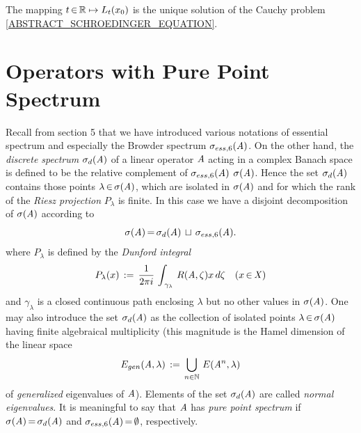\documentclass[11pt,twoside]{article}
\begin{document}
\begin{itemize}[leftmargin=12pt,itemsep=2mm,topsep=1mm]
\begin{theorem}\label{EXISTENCE_THEOREM_FOR_ABSTRACT_SCHROEDINGER_EQUATION}
The mapping $t {\,\in\,} {\mathbb{R}} \mapsto {L}_t(x_0)$ is the unique solution
of the Cauchy problem \eqref{ABSTRACT_SCHROEDINGER_EQUATION}.
\end{theorem}
\end{itemize}

\section{Operators with Pure Point Spectrum}                                   %
Recall from section 5 that we have introduced various notations of essential
spectrum and especially the Browder spectrum $\sigma_{ess,6}(\mathit{A})$.
On the other hand,
the \textit{discrete spectrum} $\sigma_d(\mathit{A})$ of a linear operator $\mathit{A}$
acting in a complex Banach space is defined to be
the relative complement of $\sigma_{ess,6}(\mathit{A})$ {\wrt} $\sigma(\mathit{A})$.
Hence the set $\sigma_d(\mathit{A})$ contains
those points $\lambda {\,\in\,} \sigma(\mathit{A})$,
which are isolated in $\sigma(\mathit{A})$
and for which the rank of the \textit{Riesz projection} $P_{\lambda}$ is finite.
In this case we have a disjoint decomposition of $\sigma(\mathit{A})$
according to
\[
\sigma(\mathit{A}) {\,=\,} \sigma_d(\mathit{A}) \, \sqcup \, \sigma_{ess,6}(\mathit{A}).
\]
where $P_{\lambda}$ is defined by the \textit{Dunford integral}
\begin{equation}\label{DUNFORD_FORMULA}
P_{\lambda}(x) \,:=\,
\frac{1}{2 \pi i} \, \int_{\,\gamma_{\lambda}} \, R(\mathit{A},\zeta) x \, d\zeta
\quad (x {\,\in\,} \mathit{X})
\end{equation}
and $\gamma_{\lambda}$ is a closed continuous path enclosing $\lambda$
but no other values in $\sigma(\mathit{A})$.
One may also introduce the set $\sigma_d(\mathit{A})$ as the collection
of isolated points $\lambda {\,\in\,} \sigma(\mathit{A})$
having finite algebraical multiplicity
(this magnitude is the Hamel dimension of the linear space
\[
E_{gen}(\mathit{A},\lambda) \,:=\, \bigcup_{n \in {\mathbb{N}}} \, E(\mathit{A}^n,\lambda)
\]
of \textit{generalized} eigenvalues of $\mathit{A}$).
Elements of the set $\sigma_d(\mathit{A})$ are called \textit{normal eigenvalues}.
It is meaningful to say
that $\mathit{A}$ has \textit{pure point spectrum}
if $\sigma(\mathit{A}) {\,=\,} \sigma_d(\mathit{A})$ and 
$\sigma_{ess,6}(\mathit{A}) {\,=\,} \emptyset$,
respectively.
\end{document}
